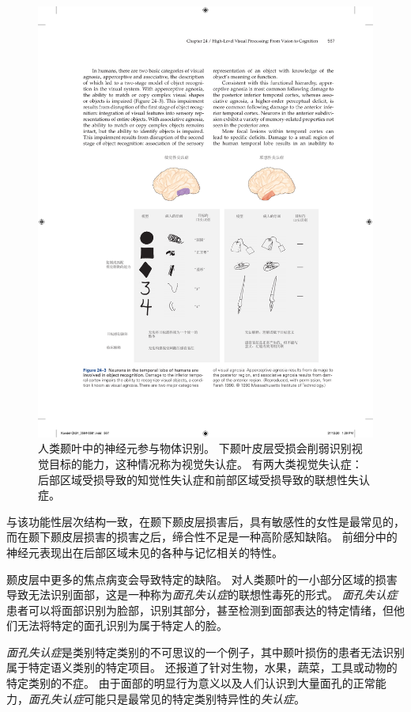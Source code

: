 \begin{figure}[htbp]
	\centering
	\includegraphics[width=1.0\linewidth]{chap24/fig_24_3}
	\caption{人类颞叶中的神经元参与物体识别。
		下颞叶皮层受损会削弱识别视觉目标的能力，这种情况称为视觉失认症。
		有两大类视觉失认症：后部区域受损导致的知觉性失认症和前部区域受损导致的联想性失认症。}
	\label{fig:24_3}
\end{figure}


与该功能性层次结构一致，在颞下颞皮层损害后，具有敏感性的女性是最常见的，而在颞下颞皮层损害的损害之后，缔合性不足是一种高阶感知缺陷。
前细分中的神经元表现出在后部区域未见的各种与记忆相关的特性。


颞皮层中更多的焦点病变会导致特定的缺陷。
对人类颞叶的一小部分区域的损害导致无法识别面部，这是一种称为\textit{面孔失认症}的联想性毒死的形式。
\textit{面孔失认症}患者可以将面部识别为脸部，识别其部分，甚至检测到面部表达的特定情绪，但他们无法将特定的面孔识别为属于特定人的脸。


\textit{面孔失认症}是类别特定类别的不可思议的一个例子，其中颞叶损伤的患者无法识别属于特定语义类别的特定项目。
还报道了针对生物，水果，蔬菜，工具或动物的特定类别的不症。
由于面部的明显行为意义以及人们认识到大量面孔的正常能力，\textit{面孔失认症}可能只是最常见的特定类别特异性的\textit{失认症}。



